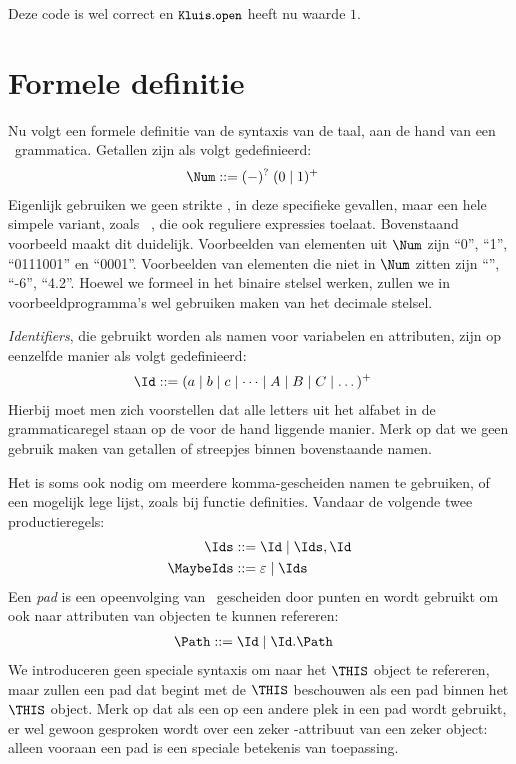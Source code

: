 Deze code is wel correct en $\text{\ttfamily\small\upshape Kluis}.\text{\ttfamily\small\upshape open}$ heeft nu waarde $1$.

\section{Formele definitie}
\label{sec:formeletaal}

Nu volgt een formele definitie van de syntaxis van de taal, aan de hand van een \BNF\ grammatica. Getallen zijn als volgt gedefinieerd:
%
\begin{align*}
  \Num \GDef (-)^?\; (0 \mid 1)^+
\end{align*}
%
Eigenlijk gebruiken we geen strikte \BNF, in deze specifieke gevallen, maar een hele simpele variant, zoals \EBNF\ \citep{ebnf}, die ook reguliere expressies toelaat. Bovenstaand voorbeeld maakt dit duidelijk. Voorbeelden van elementen uit $\Num$ zijn “0”, “1”, “0111001” en “0001”. Voorbeelden van elementen die niet in $\Num$ zitten zijn “”, “-6”, “4.2”. Hoewel we formeel in het binaire stelsel werken, zullen we in voorbeeldprogramma's wel gebruiken maken van het decimale stelsel.

\emph{Identifiers}, die gebruikt worden als namen voor variabelen en attributen, zijn op eenzelfde manier als volgt gedefinieerd:
%
\begin{align*}
  \Id \GDef (a \mid b \mid c \mid \dots \mid A \mid B \mid C \mid \dots)^+
\end{align*}
%
Hierbij moet men zich voorstellen dat alle letters uit het alfabet in de grammaticaregel staan op de voor de hand liggende manier.
Merk op dat we geen gebruik maken van getallen of streepjes binnen bovenstaande namen.

Het is soms ook nodig om meerdere komma-gescheiden namen te gebruiken, of een mogelijk lege lijst, zoals bij functie definities. Vandaar de volgende twee productieregels:
%
\begin{align*}
  \Ids      \GDef \Id \mid \Ids, \Id \\
  \MaybeIds \GDef \varepsilon \mid \Ids
\end{align*}
%
Een \emph{pad} is een opeenvolging van \Ids\ gescheiden door punten en wordt gebruikt om ook naar attributen van objecten te kunnen refereren:
%
\begin{align*}
  \Path \GDef \Id \mid \Id . \Path
\end{align*}
%
We introduceren geen speciale syntaxis om naar het $\THIS$ object te refereren, maar zullen een pad dat begint met de \Id $\THIS$ beschouwen als een pad binnen het $\THIS$ object. Merk op dat als een  op een andere plek in een pad wordt gebruikt, er wel gewoon gesproken wordt over een zeker -attribuut van een zeker object: alleen vooraan een pad is een speciale betekenis van toepassing.

